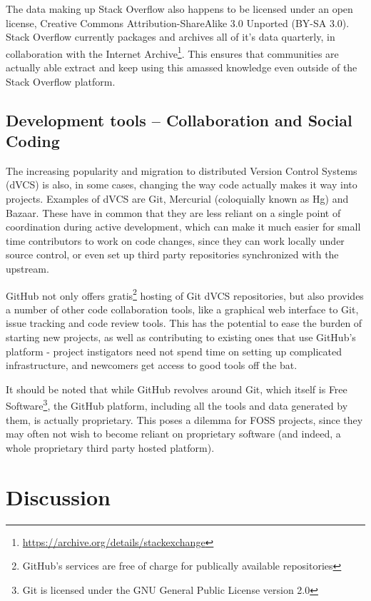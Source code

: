 \documentclass[a4paper,11pt]{article} %
\begin{document}
The data making up Stack Overflow also happens to be licensed under an open
license, Creative Commons Attribution-ShareAlike 3.0 Unported (BY-SA
3.0). Stack Overflow currently packages and archives all of it's data
quarterly, in collaboration with the Internet
Archive\footnote{\url{https://archive.org/details/stackexchange}}. This
ensures that communities are actually able extract and keep using this
amassed knowledge even outside of the Stack Overflow platform.


\subsection{Development tools -- Collaboration and Social Coding}

The increasing popularity and migration to distributed Version Control
Systems (dVCS) is also, in some cases, changing the way code actually makes
it way into projects. Examples of dVCS are Git, Mercurial (coloquially known
as Hg) and Bazaar. These have in common that they are less reliant on a
single point of coordination during active development, which can make it
much easier for small time contributors to work on code changes, since they
can work locally under source control, or even set up third party
repositories synchronized with the upstream.

GitHub not only offers gratis\footnote{GitHub's services are free of charge
  for publically available repositories} hosting of Git dVCS repositories,
but also provides a number of other code collaboration tools, like a
graphical web interface to Git, issue tracking and code review tools. This
has the potential to ease the burden of starting new projects, as well as
contributing to existing ones that use GitHub's platform - project
instigators need not spend time on setting up complicated infrastructure,
and newcomers get access to good tools off the bat.

It should be noted that while GitHub revolves around Git, which itself is
Free Software\footnote{Git is licensed under the GNU General Public License
  version 2.0}, the GitHub platform, including all the tools and data
generated by them, is actually proprietary. This poses a dilemma for FOSS
projects, since they may often not wish to become reliant on proprietary
software (and indeed, a whole proprietary third party hosted platform).


\section{Discussion}
\end{document}
